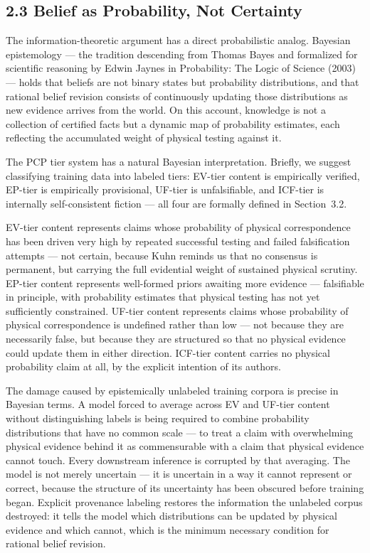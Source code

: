\documentclass[
]{article}
\begin{document}
\subsection{2.3 Belief as Probability, Not
Certainty}\label{belief-as-probability-not-certainty}

The information-theoretic argument has a direct probabilistic analog.
Bayesian epistemology --- the tradition descending from Thomas Bayes and
formalized for scientific reasoning by Edwin Jaynes in Probability: The
Logic of Science (2003) --- holds that beliefs are not binary states but
probability distributions, and that rational belief revision consists of
continuously updating those distributions as new evidence arrives from
the world. On this account, knowledge is not a collection of certified
facts but a dynamic map of probability estimates, each reflecting the
accumulated weight of physical testing against it.

The PCP tier system has a natural Bayesian interpretation. Briefly, we
suggest classifying training data into labeled tiers: EV-tier content is
empirically verified, EP-tier is empirically provisional, UF-tier is
unfalsifiable, and ICF-tier is internally self-consistent fiction ---
all four are formally defined in Section~3.2.

EV-tier content represents claims whose probability of physical
correspondence has been driven very high by repeated successful testing
and failed falsification attempts --- not certain, because Kuhn reminds
us that no consensus is permanent, but carrying the full evidential
weight of sustained physical scrutiny. EP-tier content represents
well-formed priors awaiting more evidence --- falsifiable in principle,
with probability estimates that physical testing has not yet
sufficiently constrained. UF-tier content represents claims whose
probability of physical correspondence is undefined rather than low ---
not because they are necessarily false, but because they are structured
so that no physical evidence could update them in either direction.
ICF-tier content carries no physical probability claim at all, by the
explicit intention of its authors.

The damage caused by epistemically unlabeled training corpora is precise
in Bayesian terms. A model forced to average across EV and UF-tier
content without distinguishing labels is being required to combine
probability distributions that have no common scale --- to treat a claim
with overwhelming physical evidence behind it as commensurable with a
claim that physical evidence cannot touch. Every downstream inference is
corrupted by that averaging. The model is not merely uncertain --- it is
uncertain in a way it cannot represent or correct, because the structure
of its uncertainty has been obscured before training began. Explicit
provenance labeling restores the information the unlabeled corpus
destroyed: it tells the model which distributions can be updated by
physical evidence and which cannot, which is the minimum necessary
condition for rational belief revision.
\end{document}
